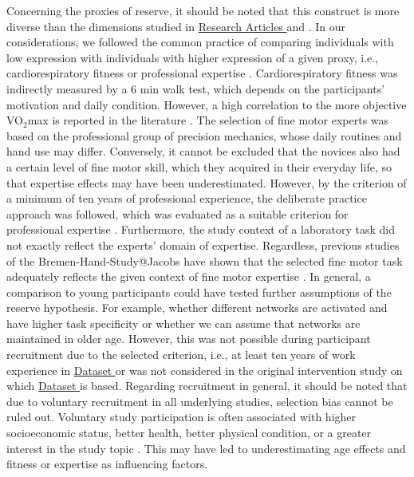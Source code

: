 Concerning the proxies of reserve, it should be noted that this construct is more diverse than the dimensions studied in \hyperref[results:paperIII]{Research Articles } and \hyperref[results:paperIV]{}. In our considerations, we followed the common practice of comparing individuals with low expression with individuals with higher expression of a given proxy, i.e., cardiorespiratory fitness or professional expertise \cite{Koen2019}. Cardiorespiratory fitness was indirectly measured by a 6 min walk test, which depends on the participants' motivation and daily condition. However, a high correlation to the more objective VO$_2$max is reported in the literature \cite{Zhang2017}. The selection of fine motor experts was based on the professional group of precision mechanics, whose daily routines and hand use may differ. Conversely, it cannot be excluded that the novices also had a certain level of fine motor skill, which they acquired in their everyday life, so that expertise effects may have been underestimated. However, by the criterion of a minimum of ten years of professional experience, the deliberate practice approach was followed, which was evaluated as a suitable criterion for professional expertise \cite{Ericsson1991, Voelcker-Rehage2013}. Furthermore, the study context of a laboratory task did not exactly reflect the experts' domain of expertise. Regardless, previous studies of the Bremen-Hand-Study@Jacobs have shown that the selected fine motor task adequately reflects the given context of fine motor expertise \cite{Vieluf2018, Goelz2018, Vieluf2012, Vieluf2013}. In general, a comparison to young participants could have tested further assumptions of the reserve hypothesis. For example, whether different networks are activated and have higher task specificity or whether we can assume that networks are maintained in older age. However, this was not possible during participant recruitment due to the selected criterion, i.e., at least ten years of work experience in \hyperref[methods:datasets:I]{Dataset } or was not considered in the original intervention study on which \hyperref[methods:datasets:III]{Dataset } is based. Regarding recruitment in general, it should be noted that due to voluntary recruitment in all underlying studies, selection bias cannot be ruled out. Voluntary study participation is often associated with higher socioeconomic status, better health, better physical condition, or a greater interest in the study topic \cite{Ganguli1998, Peters-Davis2001, Dodge2014}. This may have led to underestimating age effects and fitness or expertise as influencing factors.\\
